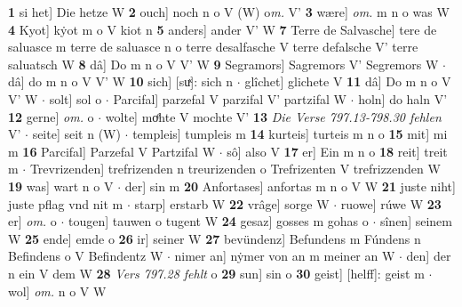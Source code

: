\documentclass[8pt,a4paper,notitlepage]{article}
\begin{document}
\begin{table}[ht]
\begin{minipage}[t]{0.5\linewidth}
\textbf{1} si het] Die hetze W \textbf{2} ouch] noch n o V (W) o\textit{m. } V' \textbf{3} wære] \textit{om.} m n o was W \textbf{4} Kyot] kẏot m o V kiot n \textbf{5} anders] ander V' W \textbf{7} Terre de Salvasche] tere de saluasce m terre de saluasce n o terre desalfasche V terre defalsche V' terre saluatsch W \textbf{8} dâ] Do m n o V V' W \textbf{9} Segramors] Sagremors V' Segremors W  $\cdot$ dâ] do m n o V V' W \textbf{10} sich] [suͯ]: sich n  $\cdot$ glîchet] glichete V \textbf{11} dâ] Do m n o V V' W  $\cdot$ solt] sol o  $\cdot$ Parcifal] parzefal V parzifal V' partzifal W  $\cdot$ holn] do haln V' \textbf{12} gerne] \textit{om.} o  $\cdot$ wolte] moͤhte V mochte V' \textbf{13} \textit{Die Verse 797.13-798.30 fehlen} V'   $\cdot$ seite] seit n (W)  $\cdot$ templeis] tumpleis m \textbf{14} kurteis] turteis m n o \textbf{15} mit] mi m \textbf{16} Parcifal] Parzefal V Partzifal W  $\cdot$ sô] also V \textbf{17} er] Ein m n o \textbf{18} reit] treit m  $\cdot$ Trevrizenden] trefrizenden n treurizenden o Trefrizenten V trefrizzenden W \textbf{19} was] wart n o V  $\cdot$ der] sin m \textbf{20} Anfortases] anfortas m n o V W \textbf{21} juste niht] juste pflag vnd nit m  $\cdot$ starp] erstarb W \textbf{22} vrâge] sorge W  $\cdot$ ruowe] rúwe W \textbf{23} er] \textit{om.} o  $\cdot$ tougen] tauwen o tugent W \textbf{24} gesaz] gosses m gohas o  $\cdot$ sînen] seinem W \textbf{25} ende] emde o \textbf{26} ir] seiner W \textbf{27} bevündenz] Befundens m Fúndens n Befindens o V Befindentz W  $\cdot$ nimer an] nẏmer von an m meiner an W  $\cdot$ den] der n ein V dem W \textbf{28} \textit{Vers 797.28 fehlt} o  \textbf{29} sun] sin o \textbf{30} geist] [helff]: geist m  $\cdot$ wol] \textit{om.} n o V W \newline
\end{minipage}
\end{table}
\newpage
\end{document}
